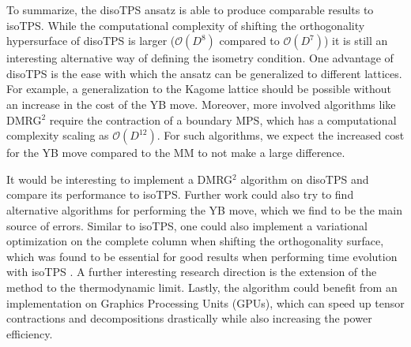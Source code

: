 To summarize, the disoTPS ansatz is able to produce comparable results to isoTPS. While the computational complexity of shifting the orthogonality hypersurface of disoTPS is larger ($\mathcal{O}(D^8)$ compared to $\mathcal{O}(D^7)$) it is still an interesting alternative way of defining the isometry condition. One advantage of disoTPS is the ease with which the ansatz can be generalized to different lattices. For example, a generalization to the Kagome lattice should be possible without an increase in the cost of the YB move. Moreover, more involved algorithms like DMRG$^2$ require the contraction of a boundary MPS, which has a computational complexity scaling as $\mathcal{O}(D^{12})$. For such algorithms, we expect the increased cost for the YB move compared to the MM to not make a large difference. \par
It would be interesting to implement a DMRG$^2$ algorithm on disoTPS and compare its performance to isoTPS. Further work could also try to find alternative algorithms for performing the YB move, which we find to be the main source of errors. Similar to isoTPS, one could also implement a variational optimization on the complete column when shifting the orthogonality surface, which was found to be essential for good results when performing time evolution with isoTPS \cite{cite:efficient_simulation_of_dynamics_in_two_dimensional_quantum_spin_systems}. A further interesting research direction is the extension of the method to the thermodynamic limit. Lastly, the algorithm could benefit from an implementation on Graphics Processing Units (GPUs), which can speed up tensor contractions and decompositions drastically while also increasing the power efficiency.